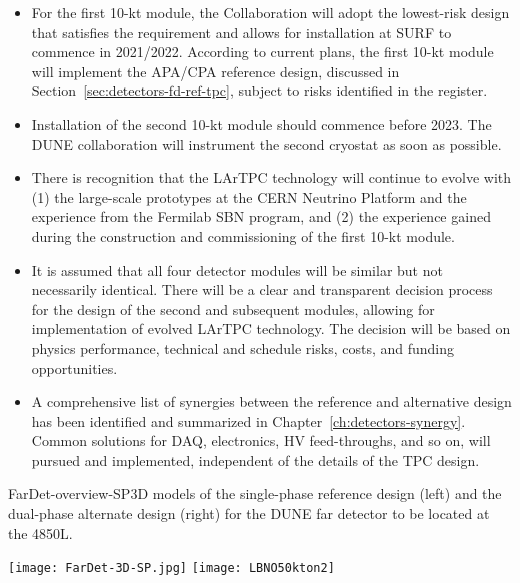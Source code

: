 \begin{itemize}
\item For the first 10-kt module, the Collaboration will adopt the lowest-risk design that satisfies the requirement and allows for installation at SURF to commence in 2021/2022. According to current plans, the first 10-kt module will implement the APA/CPA reference design, discussed in Section~\ref{sec:detectors-fd-ref-tpc}, subject to risks identified in the register.

\item Installation of the second 10-kt module should commence before 2023. The DUNE collaboration will instrument the second cryostat as soon as possible.

\item There is recognition that the LArTPC technology will continue to evolve with (1) the large-scale prototypes at the CERN Neutrino Platform and the experience from the Fermilab SBN program, and (2) the experience gained during the construction and commissioning of the first 10-kt module. 

\item It is assumed that all four detector modules will be similar but not necessarily identical. There will be a clear and transparent decision process for the design of the second and subsequent modules, allowing for implementation of evolved LArTPC technology. The decision will be based on physics performance, technical and schedule risks, costs, and funding opportunities.

\item A comprehensive list of synergies between the reference and alternative design has been identified and summarized in Chapter~\ref{ch:detectors-synergy}. Common solutions for DAQ, electronics, HV feed-throughs, and so on, will pursued and implemented, independent of the details of the TPC design. 
\end{itemize}


\begin{cdrfigure}{FarDet-overview-SP}{3D models of the single-phase reference design (left) and the dual-phase alternate design (right) for the DUNE far detector to be located at the 4850L. }
\centering
\begin{minipage}[b]{1.0\textwidth}
\begin{center}
\texttt{[image: FarDet-3D-SP.jpg]}
\texttt{[image: LBNO50kton2]}
\end{center}
\end{minipage}
\end{cdrfigure}

